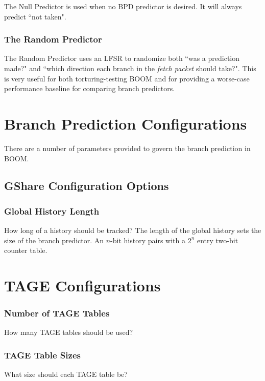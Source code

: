 The Null Predictor is used when no BPD predictor is desired. It will always predict ``not taken".

\subsubsection{The Random Predictor}

The Random Predictor uses an LFSR to randomize both ``was a prediction made?" and ``which direction each branch in the {\em fetch packet} should take?".  This is very useful for both torturing-testing BOOM and for providing a worse-case performance baseline for comparing branch predictors.

\section{Branch Prediction Configurations}

There are a number of parameters provided to govern the branch prediction in BOOM.

\subsection{GShare Configuration Options}

\subsubsection{Global History Length}

How long of a history should be tracked?  The length of the global history sets the size of the branch predictor. An $n$-bit history pairs with a $2^n$ entry two-bit counter table. 

\section{TAGE Configurations}

\subsubsection{Number of TAGE Tables}

How many TAGE tables should be used?

\subsubsection{TAGE Table Sizes}

What size should each TAGE table be?

